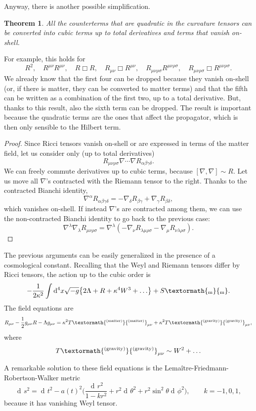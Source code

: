 \documentclass[a4paper,12pt]{book}
\newcommand{\ped}[1]{\textormath{\textsubscript{#1}}{_{\mathrm{#1}}}}
\newcommand{\ap}[1]{\textormath{\textsuperscript{#1}}{^{\mathrm{#1}}}}
\newcommand{\dd}{\mathop{\mathrm{d}\!}{}}
\newtheorem{theorem}{Theorem}
\theoremstyle{definition}
\theoremstyle{remark}
\begin{document}
Anyway, there is another possible simplification.
\begin{theorem}
All the counterterms that are quadratic in the curvature tensors can be converted into cubic terms up to total derivatives and terms that vanish on-shell.
\end{theorem}
For example, this holds for
\[R^2,\quad R^{\mu\nu}R^{\mu\nu},\quad R\Box R,\quad R_{\mu\nu}\Box R^{\mu\nu},\quad R_{\mu\nu\rho\sigma}R^{\mu\nu\rho\sigma},\quad R_{\mu\nu\rho\sigma}\Box R^{\mu\nu\rho\sigma}.\]
We already know that the first four can be dropped because they vanish on-shell (or, if there is matter, they can be converted to matter terms) and that the fifth can be written as a combination of the first two, up to a total derivative. But, thanks to this result, also the sixth term can be dropped. The result is important because the quadratic terms are the ones that affect the propagator, which is then only sensible to the Hilbert term.
\begin{proof}
Since Ricci tensors vanish on-shell or are expressed in terms of the matter field, let us consider only (up to total derivatives)
\[R_{\mu\nu\rho\sigma}\nabla\cdots\nabla R_{\alpha\beta\gamma\delta}.\]
We can freely commute derivatives up to cubic terms, because $[\nabla,\nabla]\sim R$. Let us move all $\nabla$'s contracted with the Riemann tensor to the right. Thanks to the contracted Bianchi identity,
\[\nabla^\alpha R_{\alpha\beta\gamma\delta}=-\nabla_\delta R_{\beta\gamma}+\nabla_\gamma R_{\beta\delta},\]
which vanishes on-shell. If instead $\nabla$'s are contracted among them, we can use the non-contracted Bianchi identity to go back to the previous case:
\[\nabla^\lambda\nabla_\lambda R_{\mu\nu\rho\sigma}=\nabla^\lambda(-\nabla_\nu R_{\lambda\mu\rho\sigma}-\nabla_\mu R_{\nu\lambda\rho\sigma}).\]
\end{proof}

The previous arguments can be easily generalized in the presence of a cosmological constant. Recalling that the Weyl and Riemann tensors differ by Ricci tensors, the action up to the cubic order is
\[-\frac1{2\kappa^2}\int\dd^4x\sqrt{-g}\bigl\{2\Lambda+R+\kappa^4W^3+\ldots\bigr\}+S\ped{m}.\]
The field equations are
\[R_{\mu\nu}-\frac12g_{\mu\nu}R-\Lambda g_{\mu\nu}=\kappa^2T\ap{(matter)}_{\mu\nu}+\kappa^2T\ap{(gravity)}_{\mu\nu},\]
where
\[T\ap{(gravity)}_{\mu\nu}\sim W^2+\ldots\]

A remarkable solution to these field equations is the Lemaître-Friedmann-Robertson-Walker metric
\[\dd s^2=\dd t^2-a(t)^2\biggl(\frac{\dd r^2}{1-kr^2}+r^2\dd\theta^2+r^2\sin^2\theta\dd\phi^2\biggr),\qquad k=-1,0,1,\]
because it has vanishing Weyl tensor.
\end{document}
